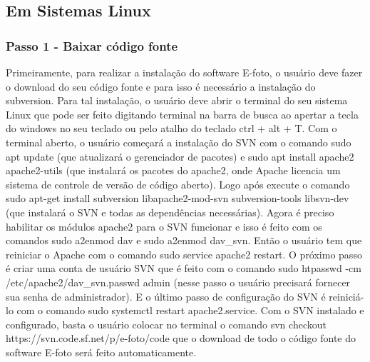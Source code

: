 \subsection{Em Sistemas Linux}

\subsubsection{Passo 1 - Baixar código fonte}
Primeiramente, para realizar a instalação do software E-foto, o usuário deve fazer o download do seu código fonte e para isso é necessário a instalação do subversion. Para tal instalação, o usuário deve abrir o terminal do seu sistema Linux que pode ser feito digitando terminal na barra de busca ao apertar a tecla do windows no seu teclado ou pelo atalho do teclado ctrl + alt + T. Com o terminal aberto, o usuário começará a instalação do SVN com o comando sudo apt update (que atualizará o gerenciador de pacotes) e sudo apt install apache2 apache2-utils (que instalará os pacotes do apache2, onde Apache licencia um sistema de controle de versão de código aberto). Logo após execute o comando sudo apt-get install subversion libapache2-mod-svn subversion-tools libsvn-dev (que instalará o SVN e todas as dependências necessárias). Agora é preciso habilitar os módulos apache2 para o SVN funcionar e isso é feito com os comandos sudo a2enmod dav e sudo a2enmod dav\_svn. Então o usuário tem que reiniciar o Apache com o comando sudo service apache2 restart. O próximo passo é criar uma conta de usuário SVN que é feito com o comando sudo htpasswd -cm /etc/apache2/dav_svn.passwd admin (nesse passo o usuário precisará fornecer sua senha de administrador). E o último passo de configuração do SVN é reiniciá-lo com o comando sudo systemctl restart apache2.service. Com o SVN instalado e configurado, basta o usuário colocar no terminal o comando svn checkout https://svn.code.sf.net/p/e-foto/code que o download de todo o código fonte do software E-foto será feito automaticamente.  %
    
